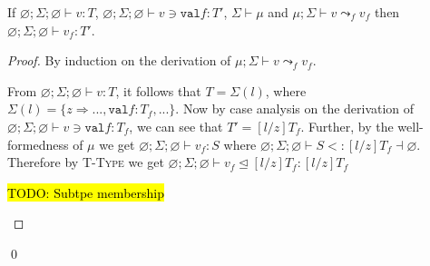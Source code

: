 \documentclass{llncs}
\numberwithin{subsubcase}{subcase}
\numberwithin{subcase}{casethm}
\numberwithin{casethm}{theorem}
\numberwithin{casethm}{lemma}
\begin{document}
\newpage

\begin{lemma} \label{lem:field_leadsto_preservation}
If $\varnothing; \Sigma; \varnothing \vdash v : T$,
$\varnothing; \Sigma; \varnothing \vdash v \ni \texttt{val} f : T'$, 
$\Sigma \vdash  \mu$ and $\mu; \Sigma \vdash v \leadsto_f v_f$ then 
$\varnothing; \Sigma; \varnothing \vdash v_f : T'$.
\end{lemma}
\begin{proof}
By induction on the derivation of $\mu; \Sigma \vdash v \leadsto_f v_f$.
\begin{casethm}
From $\varnothing; \Sigma; \varnothing \vdash v : T$, it follows that 
$T = \Sigma(l)$, where 
$\Sigma(l) = \{z \Rightarrow ..., \texttt{val} f : T_f, ...\}$. Now by 
case analysis on the derivation of 
$\varnothing; \Sigma; \varnothing \vdash v \ni \texttt{val} f : T_f$, we 
can see that $T' = [l/z]T_f$.
Further, by the well-formedness of $\mu$ we get
$\varnothing; \Sigma; \varnothing \vdash v_f : S$ where 
$\varnothing; \Sigma; \varnothing \vdash S <: [l/z]T_f \dashv \varnothing$. Therefore 
by \textsc{T-Type} we get $\varnothing; \Sigma; \varnothing \vdash v_f\unlhd [l/z]T_f : [l/z]T_f$
\end{casethm}
\begin{casethm}
\hl{TODO: Subtpe membership}
\end{casethm}
\end{proof}
\qed
\end{document}

